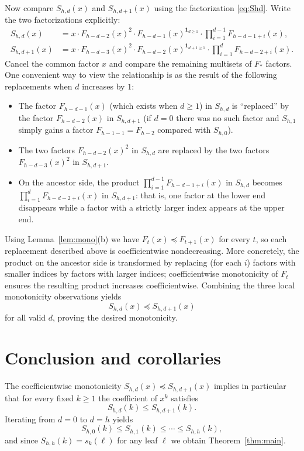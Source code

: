 \documentclass[11pt]{article}
\begin{document}
Now compare $S_{h,d}(x)$ and $S_{h,d+1}(x)$ using the factorization \eqref{eq:Shd}. Write the two factorizations explicitly:
\begin{align*}
	S_{h,d}(x)   & =x\cdot F_{h-d-2}(x)^2\cdot F_{h-d-1}(x)^{\mathbf{1}_{d\ge1}}\cdot\prod_{i=1}^{d-1} F_{h-d-1+i}(x), \\
	S_{h,d+1}(x) & =x\cdot F_{h-d-3}(x)^2\cdot F_{h-d-2}(x)^{\mathbf{1}_{d+1\ge1}}\cdot\prod_{i=1}^{d} F_{h-d-2+i}(x).
\end{align*}
Cancel the common factor $x$ and compare the remaining multisets of $F_\ast$ factors. One convenient way to view the relationship is as the result of the following replacements when $d$ increases by $1$:
\begin{itemize}[nosep]
	\item The factor $F_{h-d-1}(x)$ (which exists when $d\ge1$) in $S_{h,d}$ is ``replaced'' by the factor $F_{h-d-2}(x)$ in $S_{h,d+1}$ (if $d=0$ there was no such factor and $S_{h,1}$ simply gains a factor $F_{h-1-1}=F_{h-2}$ compared with $S_{h,0}$).
	\item The two factors $F_{h-d-2}(x)^2$ in $S_{h,d}$ are replaced by the two factors $F_{h-d-3}(x)^2$ in $S_{h,d+1}$.
	\item On the ancestor side, the product $\prod_{i=1}^{d-1}F_{h-d-1+i}(x)$ in $S_{h,d}$ becomes $\prod_{i=1}^{d}F_{h-d-2+i}(x)$ in $S_{h,d+1}$: that is, one factor at the lower end disappears while a factor with a strictly larger index appears at the upper end.
\end{itemize}

Using Lemma~\ref{lem:mono}(b) we have $F_{t}(x)\preceq F_{t+1}(x)$ for every $t$, so each replacement described above is coefficientwise nondecreasing. More concretely, the product on the ancestor side is transformed by replacing (for each $i$) factors with smaller indices by factors with larger indices; coefficientwise monotonicity of $F_t$ ensures the resulting product increases coefficientwise. Combining the three local monotonicity observations yields
\[
	S_{h,d}(x)\preceq S_{h,d+1}(x)
\]
for all valid $d$, proving the desired monotonicity.

\section{Conclusion and corollaries}

The coefficientwise monotonicity $S_{h,d}(x)\preceq S_{h,d+1}(x)$ implies in particular that for every fixed $k\ge1$ the coefficient of $x^k$ satisfies
\[S_{h,d}(k)\le S_{h,d+1}(k).
\]
Iterating from $d=0$ to $d=h$ yields
\[S_{h,0}(k)\le S_{h,1}(k)\le\cdots\le S_{h,h}(k),
\]
and since $S_{h,h}(k)=s_k(\ell)$ for any leaf $\ell$ we obtain Theorem~\ref{thm:main}.
\end{document}
